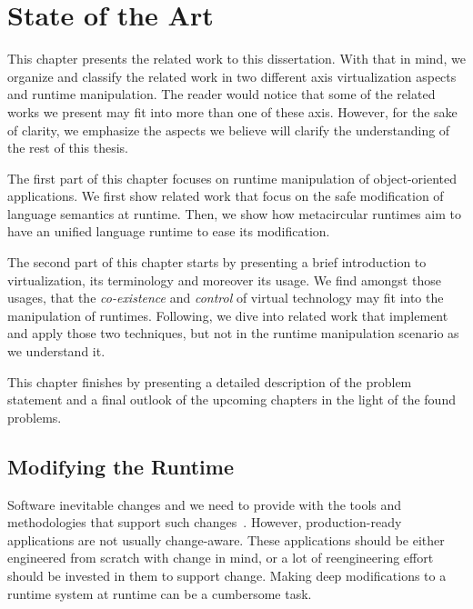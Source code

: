 
\chapter{State of the Art}
\minitoc
\introduction

This chapter presents the related work to this dissertation. With that in mind, we organize and classify the related work in two different axis \ie virtualization aspects and runtime manipulation. The reader would notice that some of the related works we present may fit into more than one of these axis. However, for the sake of clarity, we emphasize the aspects we believe will clarify the understanding of the rest of this thesis.

The first part of this chapter focuses on runtime manipulation of object-oriented applications. We first show related work that focus on the safe modification of language semantics at runtime. Then, we show how metacircular runtimes aim to have an unified language runtime to ease its modification. 

The second part of this chapter starts by presenting a brief introduction to virtualization, its terminology and moreover its usage. We find amongst those usages, that the \emph{co-existence} and \emph{control} of virtual technology may fit into the manipulation of runtimes.
Following, we dive into related work that implement and apply those two techniques, but not in the runtime manipulation scenario as we understand it.

This chapter finishes by presenting a detailed description of the problem statement and a final outlook of the upcoming chapters in the light of the found problems.


\newpage

\section{Modifying the Runtime}

Software inevitable changes and we need to provide with the tools and methodologies that support such changes~\cite{Nier08b}. However, production-ready applications are not usually change-aware. These applications should be either engineered from scratch with change in mind, or a lot of reengineering effort should be invested in them to support change. Making deep modifications to a runtime system at runtime can be a cumbersome task.

